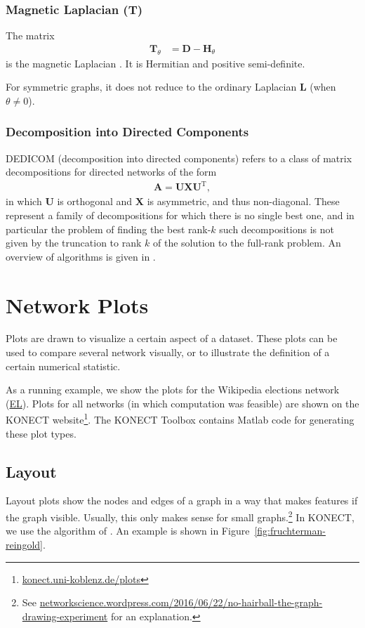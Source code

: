 \documentclass{article}
\begin{document}
\subsubsection{Magnetic Laplacian ($\mathbf T$)}
The matrix
\begin{align}
  \mathbf T_{\theta} &= \mathbf D - \mathbf H_{\theta} 
\end{align}
is the magnetic Laplacian \citep{b903}.  It is Hermitian and positive
semi-definite.   

For symmetric graphs, it does not reduce to the ordinary Laplacian
$\mathbf L$ (when $\theta \neq 0$). 

\subsubsection{Decomposition into Directed Components}
DEDICOM (decomposition into directed components) refers to a class of
matrix decompositions for directed networks of the form
\begin{align}
  \mathbf A = \mathbf U \mathbf X \mathbf U^{\mathrm T},
\end{align}
in which $\mathbf U$ is orthogonal and $\mathbf X$ is asymmetric, and
thus non-diagonal.  These represent a family of decompositions for which
there is no single best one, and in particular the problem of finding
the best rank-$k$ such decompositions is not given by the truncation to
rank $k$ of the solution to the full-rank problem.  An overview of
algorithms is given in \citep{kunegis:directed-decomposition}. 

\section{Network Plots}
\label{sec:plots}
Plots are drawn to visualize a certain aspect of a dataset. These plots
can be used to compare several network visually, or to illustrate the
definition of a certain numerical statistic.

As a running example, we show the plots for the Wikipedia elections
network
(\href{http://konect.uni-koblenz.de/networks/elec}{\textsf{EL}}).  Plots
for all networks (in which computation was feasible) are shown on the
KONECT
website\footnote{\href{http://konect.uni-koblenz.de/plots/}{konect.uni-koblenz.de/plots}}. The
KONECT Toolbox contains Matlab code for generating these plot types.

\subsection{Layout}
Layout plots show the nodes and edges of a graph in a way that makes
features if the graph visible.  Usually, this only makes sense for small
graphs.\footnote{See
  \href{https://networkscience.wordpress.com/2016/06/22/no-hairball-the-graph-drawing-experiment/}{networkscience.wordpress.com/2016/06/22/no-hairball-the-graph-drawing-experiment}
  for an explanation.}
In KONECT, we use the algorithm of \cite{b870}.  An
example is shown in Figure~\ref{fig:fruchterman-reingold}.
\end{document}
